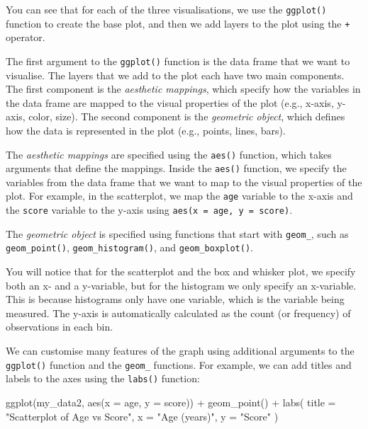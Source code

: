 \documentclass[
  letterpaper,
  8pt,
  a4paper]{book}
\newenvironment{Shaded}{\begin{snugshade}}{\end{snugshade}}
\newcommand{\AttributeTok}[1]{\textcolor[rgb]{0.40,0.45,0.13}{#1}}
\newcommand{\FunctionTok}[1]{\textcolor[rgb]{0.28,0.35,0.67}{#1}}
\newcommand{\NormalTok}[1]{\textcolor[rgb]{0.00,0.23,0.31}{#1}}
\newcommand{\SpecialCharTok}[1]{\textcolor[rgb]{0.37,0.37,0.37}{#1}}
\newcommand{\StringTok}[1]{\textcolor[rgb]{0.13,0.47,0.30}{#1}}
\begin{document}
You can see that for each of the three visualisations, we use the
\texttt{ggplot()} function to create the base plot, and then we add
layers to the plot using the \texttt{+} operator.

The first argument to the \texttt{ggplot()} function is the data frame
that we want to visualise. The layers that we add to the plot each have
two main components. The first component is the \emph{aesthetic
mappings}, which specify how the variables in the data frame are mapped
to the visual properties of the plot (e.g., x-axis, y-axis, color,
size). The second component is the \emph{geometric object}, which
defines how the data is represented in the plot (e.g., points, lines,
bars).

The \emph{aesthetic mappings} are specified using the \texttt{aes()}
function, which takes arguments that define the mappings. Inside the
\texttt{aes()} function, we specify the variables from the data frame
that we want to map to the visual properties of the plot. For example,
in the scatterplot, we map the \texttt{age} variable to the x-axis and
the \texttt{score} variable to the y-axis using
\texttt{aes(x\ =\ age,\ y\ =\ score)}.

The \emph{geometric object} is specified using functions that start with
\texttt{geom\_}, such as \texttt{geom\_point()},
\texttt{geom\_histogram()}, and \texttt{geom\_boxplot()}.

You will notice that for the scatterplot and the box and whisker plot,
we specify both an x- and a y-variable, but for the histogram we only
specify an x-variable. This is because histograms only have one
variable, which is the variable being measured. The y-axis is
automatically calculated as the count (or frequency) of observations in
each bin.

We can customise many features of the graph using additional arguments
to the \texttt{ggplot()} function and the \texttt{geom\_} functions. For
example, we can add titles and labels to the axes using the
\texttt{labs()} function:

\begin{Shaded}
\begin{Highlighting}[]
\FunctionTok{ggplot}\NormalTok{(my\_data2, }\FunctionTok{aes}\NormalTok{(}\AttributeTok{x =}\NormalTok{ age, }\AttributeTok{y =}\NormalTok{ score)) }\SpecialCharTok{+}
  \FunctionTok{geom\_point}\NormalTok{() }\SpecialCharTok{+}
  \FunctionTok{labs}\NormalTok{(}
    \AttributeTok{title =} \StringTok{"Scatterplot of Age vs Score"}\NormalTok{,}
    \AttributeTok{x =} \StringTok{"Age (years)"}\NormalTok{,}
    \AttributeTok{y =} \StringTok{"Score"}
\NormalTok{  )}
\end{Highlighting}
\end{Shaded}
\end{document}
